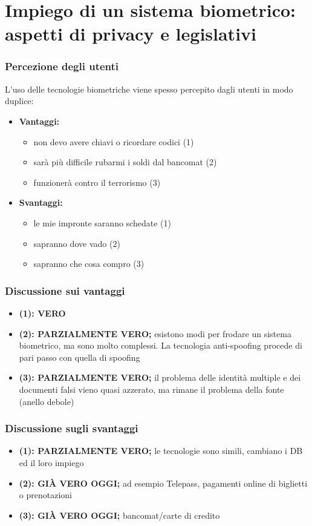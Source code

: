 \newpage

\section{Impiego di un sistema biometrico: aspetti di privacy e legislativi}

\subsubsection{Percezione degli utenti}

L'uso delle tecnologie biometriche viene spesso percepito dagli utenti in modo duplice:
\begin{itemize}
    \item \textbf{Vantaggi:}
    \begin{itemize}
        \item non devo avere chiavi o ricordare codici (1)
        \item sarà più difficile rubarmi i soldi dal bancomat (2)
        \item funzionerà contro il terrorismo (3)
    \end{itemize}
    \item \textbf{Svantaggi:}
    \begin{itemize}
        \item le mie impronte saranno schedate (1)
        \item sapranno dove vado (2)
        \item sapranno che cosa compro (3)
    \end{itemize}
\end{itemize}

\subsubsection{Discussione sui vantaggi}
\begin{itemize}
    \item \textbf{(1): VERO}
    \item \textbf{(2): PARZIALMENTE VERO;} esistono modi per frodare un sistema biometrico, ma sono molto complessi. La tecnologia anti-spoofing procede di pari passo con quella di spoofing
    \item \textbf{(3): PARZIALMENTE VERO;} il problema delle identità multiple e dei documenti falsi vieno quasi azzerato, ma rimane il problema della fonte (anello debole)
\end{itemize}

\subsubsection{Discussione sugli svantaggi}
\begin{itemize}
    \item \textbf{(1): PARZIALMENTE VERO;} le tecnologie sono simili, cambiano i DB ed il loro impiego
    \item \textbf{(2): GIÀ VERO OGGI;} ad esempio Telepass, pagamenti online di biglietti o prenotazioni
    \item \textbf{(3): GIÀ VERO OGGI;} bancomat/carte di credito
\end{itemize}

